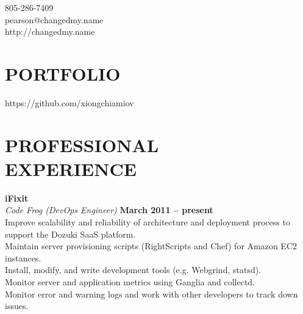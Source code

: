 \documentclass[margin,line]{resume}
\begin{document}
{
    \sc
    \hfill 805-286-7409                   \vspace{0mm}\\\vspace{0mm}%
    \hfill pearson@changedmy.name         \vspace{0mm}\\\vspace{0mm}%
    \hfill http://changedmy.name          \vspace{0mm}\\\vspace{-9mm}%
}

\begin{resume}

\vspace{6mm}

    \section{\mysidestyle \textbf{\large{P}\small{ORTFOLIO}}}

    https://github.com/xiongchiamiov

\sectionline

    \section{\mysidestyle \textbf{\large{P}\small{ROFESSIONAL\\EXPERIENCE}}}

    \textbf{\listing iFixit} \vspace{2mm}\\\vspace{1mm}%
    \textsl{Code Frog (DevOps Engineer)} \hfill \textbf{March 2011 -- present}\\
    Improve scalability and reliability of architecture and deployment process to support the Dozuki SaaS platform.\\
    Maintain server provisioning scripts (RightScripts and Chef) for Amazon EC2 instances.\\
    Install, modify, and write development tools (e.g. Webgrind, statsd).\\
    Monitor server and application metrics using Ganglia and collectd.\\
    Monitor error and warning logs and work with other developers to track down issues.


\end{resume}
\end{document}
